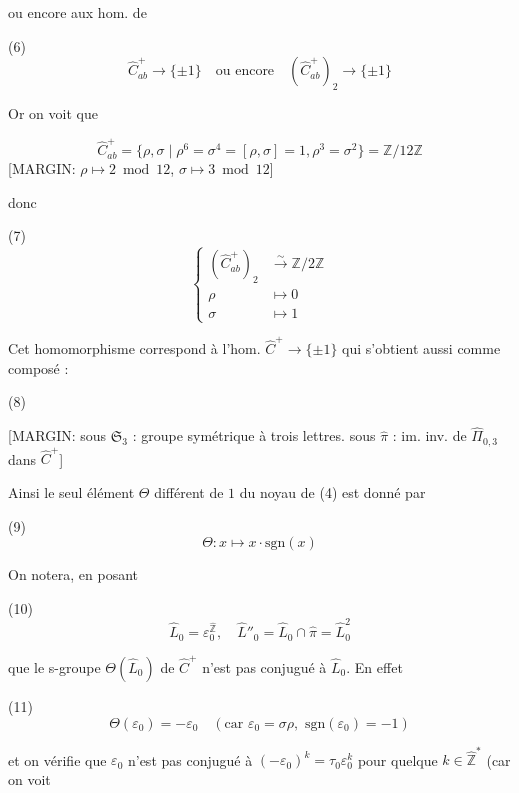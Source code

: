 \begin{enumerate}

ou encore aux hom. de

(6) $$ \widehat{C}^+_{ab} \longrightarrow \{\pm 1\} \quad \text{ou encore} \quad (\widehat{C}^+_{ab})_2 \longrightarrow \{\pm 1\} $$

Or on voit que

$$ \widehat{C}^+_{ab} = \{ \rho, \sigma \mid \rho^6 = \sigma^4 = [\rho, \sigma] = 1, \rho^3 = \sigma^2 \} = \mathbb{Z}/12\mathbb{Z} $$
[MARGIN: $\rho \mapsto 2 \bmod 12$, $\sigma \mapsto 3 \bmod 12$]

donc

(7) $$ \left\{ \begin{aligned} (\widehat{C}^+_{ab})_2 &\xrightarrow{\sim} \mathbb{Z}/2\mathbb{Z} \\ \rho &\longmapsto 0 \\ \sigma &\longmapsto 1 \end{aligned} \right. $$

Cet homomorphisme correspond à l'hom.
$\widehat{C}^+ \longrightarrow \{\pm 1\}$ qui s'obtient aussi comme
composé :

(8)
[MARGIN: sous $\mathfrak{S}_3$ : groupe symétrique à trois lettres. sous $\widehat{\pi}$ : im. inv. de $\widehat{\Pi}_{0,3}$ dans $\widehat{C}^+$]

Ainsi le seul élément $\Theta$ différent de $1$
du noyau de (4) est donné par

(9) $$ \Theta : x \longmapsto x \cdot \text{sgn}(x) $$

On notera, en posant

(10) $$ \widehat{L}_0 = \varepsilon_0^{\hat{\mathbb{Z}}}, \quad \widehat{L}''_0 = \widehat{L}_0 \cap \widehat{\pi} = \widehat{L}_0^2 $$

que le s-groupe $\Theta(\widehat{L}_0)$ de $\widehat{C}^+$
n'est pas conjugué à $\widehat{L}_0$. En effet

(11) $$ \Theta(\varepsilon_0) = -\varepsilon_0 \quad (\text{car } \varepsilon_0 = \sigma \rho, \text{ sgn}(\varepsilon_0) = -1) $$

et on vérifie que $\varepsilon_0$ n'est pas conjugué à
$(-\varepsilon_0)^k = \tau_0 \varepsilon_0^k$ pour quelque $k \in \hat{\mathbb{Z}}^*$ (car on voit

\newpage



\end{enumerate}
